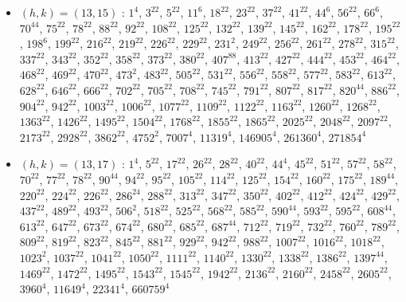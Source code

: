 \begin{itemize}
\item $(h,k)=(13,15)$ : $1^{4}$, $3^{22}$, $5^{22}$, $11^{6}$, $18^{22}$, $23^{22}$, $37^{22}$, $41^{22}$, $44^{6}$, $56^{22}$, $66^{6}$, $70^{44}$, $75^{22}$, $78^{22}$, $88^{22}$, $92^{22}$, $108^{22}$, $125^{22}$, $132^{22}$, $139^{22}$, $145^{22}$, $162^{22}$, $178^{22}$, $195^{22}$, $198^{6}$, $199^{22}$, $216^{22}$, $219^{22}$, $226^{22}$, $229^{22}$, $231^{2}$, $249^{22}$, $256^{22}$, $261^{22}$, $278^{22}$, $315^{22}$, $337^{22}$, $343^{22}$, $352^{22}$, $358^{22}$, $373^{22}$, $380^{22}$, $407^{88}$, $413^{22}$, $427^{22}$, $444^{22}$, $453^{22}$, $464^{22}$, $468^{22}$, $469^{22}$, $470^{22}$, $473^{2}$, $483^{22}$, $505^{22}$, $531^{22}$, $556^{22}$, $558^{22}$, $577^{22}$, $583^{22}$, $613^{22}$, $628^{22}$, $646^{22}$, $666^{22}$, $702^{22}$, $705^{22}$, $708^{22}$, $745^{22}$, $791^{22}$, $807^{22}$, $817^{22}$, $820^{44}$, $886^{22}$, $904^{22}$, $942^{22}$, $1003^{22}$, $1006^{22}$, $1077^{22}$, $1109^{22}$, $1122^{22}$, $1163^{22}$, $1260^{22}$, $1268^{22}$, $1363^{22}$, $1426^{22}$, $1495^{22}$, $1504^{22}$, $1768^{22}$, $1855^{22}$, $1865^{22}$, $2025^{22}$, $2048^{22}$, $2097^{22}$, $2173^{22}$, $2928^{22}$, $3862^{22}$, $4752^{2}$, $7007^{4}$, $11319^{4}$, $146905^{4}$, $261360^{4}$, $271854^{4}$
\item $(h,k)=(13,17)$ : $1^{4}$, $5^{22}$, $17^{22}$, $26^{22}$, $28^{22}$, $40^{22}$, $44^{4}$, $45^{22}$, $51^{22}$, $57^{22}$, $58^{22}$, $70^{22}$, $77^{22}$, $78^{22}$, $90^{44}$, $94^{22}$, $95^{22}$, $105^{22}$, $114^{22}$, $125^{22}$, $154^{22}$, $160^{22}$, $175^{22}$, $189^{44}$, $220^{22}$, $224^{22}$, $226^{22}$, $286^{24}$, $288^{22}$, $313^{22}$, $347^{22}$, $350^{22}$, $402^{22}$, $412^{22}$, $424^{22}$, $429^{22}$, $437^{22}$, $489^{22}$, $493^{22}$, $506^{2}$, $518^{22}$, $525^{22}$, $568^{22}$, $585^{22}$, $590^{44}$, $593^{22}$, $595^{22}$, $608^{44}$, $613^{22}$, $647^{22}$, $673^{22}$, $674^{22}$, $680^{22}$, $685^{22}$, $687^{44}$, $712^{22}$, $719^{22}$, $732^{22}$, $760^{22}$, $789^{22}$, $809^{22}$, $819^{22}$, $823^{22}$, $845^{22}$, $881^{22}$, $929^{22}$, $942^{22}$, $988^{22}$, $1007^{22}$, $1016^{22}$, $1018^{22}$, $1023^{2}$, $1037^{22}$, $1041^{22}$, $1050^{22}$, $1111^{22}$, $1140^{22}$, $1330^{22}$, $1338^{22}$, $1386^{22}$, $1397^{44}$, $1469^{22}$, $1472^{22}$, $1495^{22}$, $1543^{22}$, $1545^{22}$, $1942^{22}$, $2136^{22}$, $2160^{22}$, $2458^{22}$, $2605^{22}$, $3960^{4}$, $11649^{4}$, $22341^{4}$, $660759^{4}$

\end{itemize}
